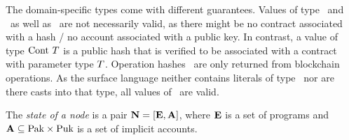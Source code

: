 \documentclass[runningheads]{llncs}
\begin{document}
The domain-specific types come with different guarantees. Values of
type \TPUH\ and \TPUK\ as well as \TADDR\ are not necessarily valid,
as there might be no contract associated with a hash / no account
associated with a public key. In contrast, a value of type
$\text{Cont}\ T$ is a public hash that is verified to be associated
with a contract with parameter type $T$. Operation hashes \OPH\
are only returned from blockchain operations. As the surface language
neither contains literals of type \TOPH\ nor are there casts into
that type, all values of \TOPH\ are valid. 

\begin{definition}%
  The \emph{state of a node} is a pair
  $\textbf{N} = [ \textbf{E}, \textbf{A}
  ]$, where $\textbf{E}$ is a
  set of programs and $\textbf{A} \subseteq \text{Pak} \times \text{Puk}$  is a set of
  implicit accounts.
\end{definition}
\end{document}
